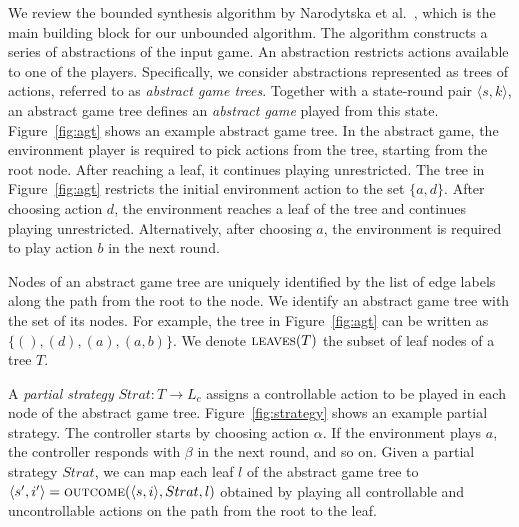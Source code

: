 \documentclass{llncs}
\begin{document}
We review the bounded synthesis algorithm by Narodytska et
al.~\cite{narodytska2014}, which is the main building block for our unbounded
algorithm.  The algorithm constructs a series of abstractions of the input
game.  An abstraction restricts actions available to one of the players.
Specifically, we consider abstractions represented as trees of actions,
referred to as \emph{abstract game trees}.  Together with a state-round pair
$\langle s,k\rangle$, an abstract game tree defines an \emph{abstract game}
played from this state.  Figure~\ref{fig:agt} shows an example abstract game
tree.  In the abstract game, the environment player is required to pick actions
from the tree, starting from the root node.  After reaching a leaf, it
continues playing unrestricted.  The tree in Figure~\ref{fig:agt} restricts the
initial environment action to the set $\{a, d\}$.  After choosing action $d$,
the environment reaches a leaf of the tree and continues playing unrestricted.
Alternatively, after choosing $a$, the environment is required to play action
$b$ in the next round.  

Nodes of an abstract game tree are uniquely identified by the list of edge
labels along the path from the root to the node.  We identify an abstract game
tree with the set of its nodes.  For example, the tree in Figure~\ref{fig:agt}
can be written as $\{(),(d),(a),(a,b)\}$.  We denote $\textsc{leaves}(T)$ the
subset of leaf nodes of a tree $T$. 

A \emph{partial strategy} $Strat: T \rightarrow L_c $ assigns a controllable
action to be played in each node of the abstract game tree.
Figure~\ref{fig:strategy} shows an example partial strategy.  The controller
starts by choosing action $\alpha$.  If the environment plays $a$, the
controller responds with $\beta$ in the next round, and so on. Given a partial
strategy $Strat$, we can map each leaf $l$ of the abstract game tree to
$\langle s',i'\rangle=\textsc{outcome}(\langle s, i\rangle, Strat, l)$ obtained
by playing all controllable and uncontrollable actions on the path from the
root to the leaf.

\end{document}
